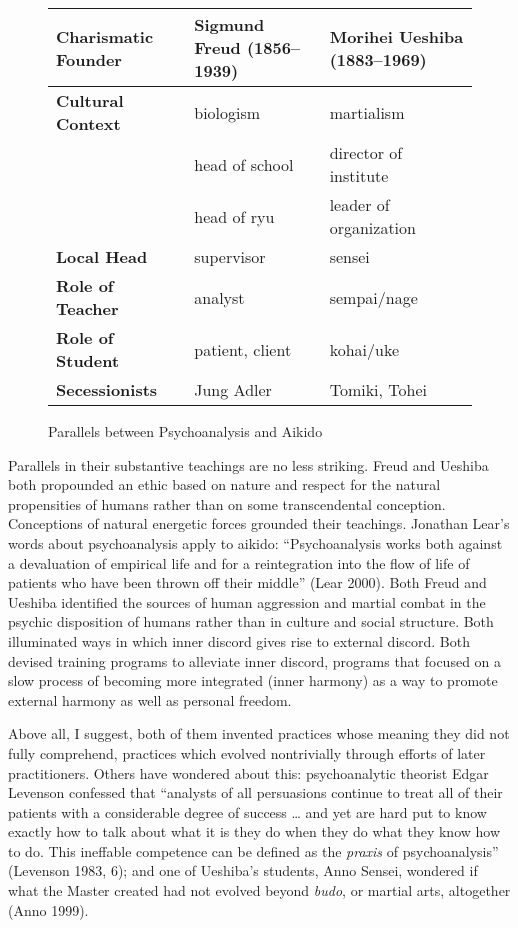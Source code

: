 \begin{figure}
\caption{Parallels between Psychoanalysis and Aikido}
\footnotesize
\centering
\begin{tabular}{ | >{\bfseries}l | l | l | }
\hline
Charismatic Founder & Sigmund Freud (1856--1939) & Morihei Ueshiba (1883--1969) \\
\hline
Cultural Context & biologism & martialism \\
\hline
\multirow{2}{*}{Disciple} & head of school & director of institute \\
 & head of ryu & leader of organization \\
\hline
Local Head & supervisor & sensei \\
\hline
Role of Teacher & analyst & sempai/nage \\
\hline
Role of Student & patient, client & kohai/uke \\
\hline
Secessionists & Jung Adler & Tomiki, Tohei \\
\hline
\end{tabular}
\end{figure}

Parallels in their substantive teachings are no less striking. Freud and Ueshiba both propounded an ethic based on nature and respect for the natural propensities of humans rather than on some transcendental conception. Conceptions of natural energetic forces grounded their teachings. Jonathan Lear's words about psychoanalysis apply to aikido: ``Psychoanalysis works both against a devaluation of empirical life and for a reintegration into the flow of life of patients who have been thrown off their middle'' (Lear 2000). Both Freud and Ueshiba identified the sources of human aggression and martial combat in the psychic disposition of humans rather than in culture and social structure. Both illuminated ways in which inner discord gives rise to external discord. Both devised training programs to alleviate inner discord, programs that focused on a slow process of becoming more integrated (inner harmony) as a way to promote external harmony as well as personal freedom. 

Above all, I suggest, both of them invented practices whose meaning they did not fully comprehend, practices which evolved nontrivially through efforts of later practitioners. Others have wondered about this: psychoanalytic theorist Edgar Levenson confessed that ``analysts of all persuasions continue to treat all of their patients with a considerable degree of success \ldots{} and yet are hard put to know exactly how to talk about what it is they do when they do what they know how to do. This ineffable competence can be defined as the \emph{praxis} of psychoanalysis'' (Levenson 1983, 6); and one of Ueshiba's students, Anno Sensei, wondered if what the Master created had not evolved beyond \emph{budo}, or martial arts, altogether (Anno 1999).

